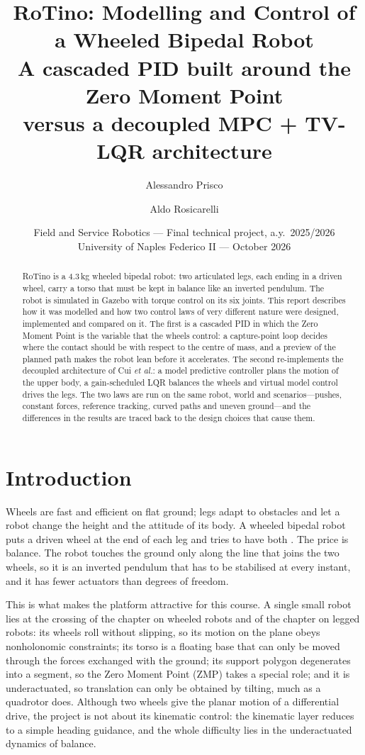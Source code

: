 \documentclass[11pt,a4paper]{article}
\title{\vspace{-1.2cm}\textbf{RoTino: Modelling and Control of a Wheeled Bipedal Robot}\\[4pt]
\large A cascaded PID built around the Zero Moment Point\\ versus a decoupled MPC + TV-LQR architecture}
\author{Alessandro Prisco \and Aldo Rosicarelli}
\date{\small Field and Service Robotics --- Final technical project, a.y.\ 2025/2026\\
University of Naples Federico II --- October 2026}
\begin{document}
\maketitle
\vspace{-0.6cm}

\begin{abstract}
\noindent RoTino is a 4.3\,kg wheeled bipedal robot: two articulated legs, each ending in a driven wheel, carry a
torso that must be kept in balance like an inverted pendulum. The robot is simulated in Gazebo with
torque control on its six joints. This report describes how it was modelled and how two control laws of very
different nature were designed, implemented and compared on it. The first is a cascaded PID in which the Zero
Moment Point is the variable that the wheels control: a capture-point loop decides where the contact should be
with respect to the centre of mass, and a preview of the planned path makes the robot lean before it accelerates.
The second re-implements the decoupled architecture of Cui \emph{et al.}: a model predictive controller plans the
motion of the upper body, a gain-scheduled LQR balances the wheels and virtual model control drives the legs.
The two laws are run on the same robot, world and scenarios---pushes, constant forces, reference tracking, curved
paths and uneven ground---and the differences in the results are traced back to the design choices that
cause them.
\end{abstract}

\section{Introduction}

Wheels are fast and efficient on flat ground; legs adapt to obstacles and let a robot change the height and the
attitude of its body. A wheeled bipedal robot puts a driven wheel at the end of each leg and tries to have both
\cite{cui2022,klemm2019}. The price is balance. The robot touches the ground only along the line that joins the two
wheels, so it is an inverted pendulum that has to be stabilised at every instant, and it has fewer actuators than
degrees of freedom.

This is what makes the platform attractive for this course. A single small robot lies at the crossing of the
chapter on wheeled robots and of the chapter on legged robots: its wheels roll without slipping, so its motion on
the plane obeys nonholonomic constraints; its torso is a floating base that can only be moved through the forces
exchanged with the ground; its support polygon degenerates into a segment, so the Zero Moment Point (ZMP) takes a
special role; and it is underactuated, so translation can only be obtained by tilting, much as a quadrotor does.
Although two wheels give the planar motion of a differential drive, the project is not about its kinematic control:
the kinematic layer reduces to a simple heading guidance, and the whole difficulty lies in the underactuated dynamics
of balance.
\end{document}
